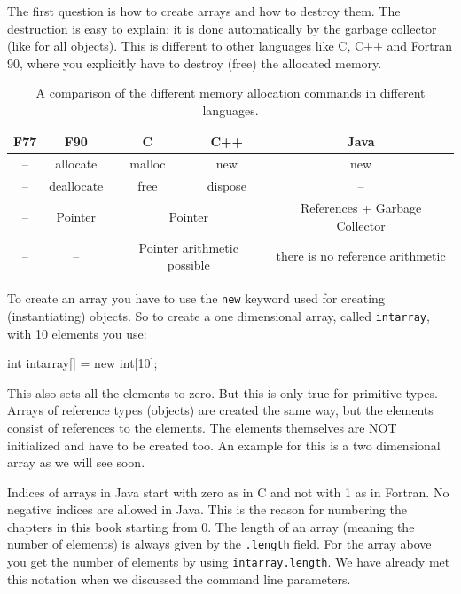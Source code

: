 The first question is how to create arrays and how to destroy them.
The destruction is easy to explain: it is done automatically
by the garbage collector (like for all objects). This is different to
other languages like C, C++ and Fortran 90, where you explicitly
have to destroy (free) the allocated memory. 
\begin{table}[htbp]
  \begin{center}
    \begin{tabular}{c|c|c|c|c}
      F77 & F90 & C & C++ & \textbf{Java} \\\hline
      -- & allocate & malloc & new & new \\
      -- & deallocate & free & dispose & -- \\
      -- & Pointer & \multicolumn{2}{c|}{Pointer} & References + Garbage Collector \\
      -- & -- & \multicolumn{2}{c|}{Pointer arithmetic possible}& there is no 
                                                    reference arithmetic \\
    \end{tabular}
    \caption{A comparison of the different memory allocation commands in different languages.}
    \label{tab:MemoryAllocation}
  \end{center}
\end{table}
To create an array you have to use the \verb|new| keyword used for
creating (instantiating) objects. So to create a one dimensional
array, called \verb|intarray|, with 10 elements you use:
\begin{sverbatim}
        int intarray[] = new int[10];
\end{sverbatim}
This also sets all the elements to zero. But this is only true for 
primitive types. Arrays of reference types (objects) are created the
same way, but the elements consist of references to the elements. The
elements themselves are NOT initialized and have to be created too.
An example for this is a two dimensional array as we will see soon.

Indices of arrays in Java start with zero as in C and not with 1
as in Fortran. No negative indices are allowed in Java. This is the 
reason for numbering the chapters in this book starting from $0$.
The length
of an array (meaning the number of elements) is always given
by the \verb|.length| field. For the array above you get the number
of elements by using \verb|intarray.length|. We have already met
this notation when we discussed the command line parameters.

